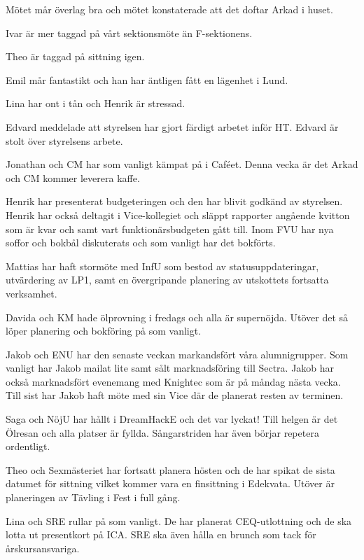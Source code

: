 \documentclass[10pt]{article}
\begin{document}
\begin{paragrafer}
\begin{paragrafer}
Mötet mår överlag bra och mötet konstaterade att det doftar Arkad i huset. 

Ivar är mer taggad på vårt sektionsmöte än F-sektionens.

Theo är taggad på sittning igen. 

Emil mår fantastikt och han har äntligen fått en lägenhet i Lund.

Lina har ont i tån och Henrik är stressad. 


Edvard meddelade att styrelsen har gjort färdigt arbetet inför HT. Edvard är stolt över styrelsens arbete. 

Jonathan och CM har som vanligt kämpat på i Caféet. Denna vecka är det Arkad och CM kommer leverera kaffe. 

Henrik har presenterat budgeteringen och den har blivit godkänd av styrelsen. 
Henrik har också deltagit i Vice-kollegiet och släppt rapporter angående kvitton som är kvar och samt vart funktionärsbudgeten gått till. 
Inom FVU har nya soffor och bokbål diskuterats och som vanligt har det bokförts. 

Mattias har haft stormöte med InfU som bestod av statusuppdateringar, utvärdering av LP1, samt en övergripande planering av utskottets fortsatta verksamhet.

Davida och KM hade ölprovning i fredags och alla är supernöjda. Utöver det så löper planering och bokföring på som vanligt. 

Jakob och ENU har den senaste veckan markandsfört våra alumnigrupper. Som vanligt har Jakob mailat lite samt sålt marknadsföring till Sectra. 
Jakob har också marknadsfört evenemang med Knightec som är på måndag nästa vecka. Till sist har Jakob haft möte med sin Vice där de planerat resten av terminen. 

Saga och NöjU har hållt i DreamHackE och det var lyckat! Till helgen är det Ölresan och alla platser är fyllda. Sångarstriden har även börjar repetera ordentligt. 

Theo och Sexmästeriet har fortsatt planera hösten och de har spikat de sista datumet för sittning vilket kommer vara en finsittning i Edekvata. 
Utöver är planeringen av Tävling i Fest i full gång. 

Lina och SRE rullar på som vanligt. De har planerat CEQ-utlottning och de ska lotta ut presentkort på ICA. SRE ska även hålla en brunch som tack för årskursansvariga. 



\end{paragrafer}
\end{paragrafer}
\end{document}
